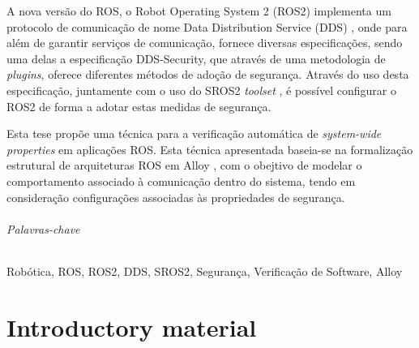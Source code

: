 \documentclass[
  oneside,
  11pt, a4paper,
  footinclude=true,
  headinclude=true,
  cleardoublepage=empty
]{scrbook}
\begin{document}
	A nova versão do ROS, o Robot Operating System 2 (ROS2) implementa um protocolo de comunicação de nome Data Distribution Service (DDS) \cite{3}, onde para além de garantir serviços de comunicação, fornece diversas especificações, sendo uma delas a especificação DDS-Security, que através de uma metodologia de \textit{plugins}, oferece diferentes métodos de adoção de segurança. Através do uso desta especificação, juntamente com o uso do SROS2 \textit{toolset} \cite{ros-dds-integration}, é possível configurar o ROS2 de forma a adotar estas medidas de segurança.

	Esta tese propõe uma técnica para a verificação automática de \textit{system-wide properties} em aplicações ROS. Esta técnica apresentada baseia-se na formalização estrutural de arquiteturas ROS em Alloy \cite{alloy-DJ}, com o obejtivo de modelar o comportamento associado à comunicação dentro do sistema, tendo em consideração configurações associadas às propriedades de segurança. 
	
	
\paragraph{Palavras-chave} Robótica, ROS, ROS2, DDS, SROS2, Segurança, Verificação de Software, Alloy


	\cleardoublepage

	\setcounter{page}{3}

	\cleardoublepage
	\tableofcontents

	\cleardoublepage
	\listoffigures



	\cleardoublepage
	\setcounter{page}{3}

\part{Introductory material}










\end{document}
